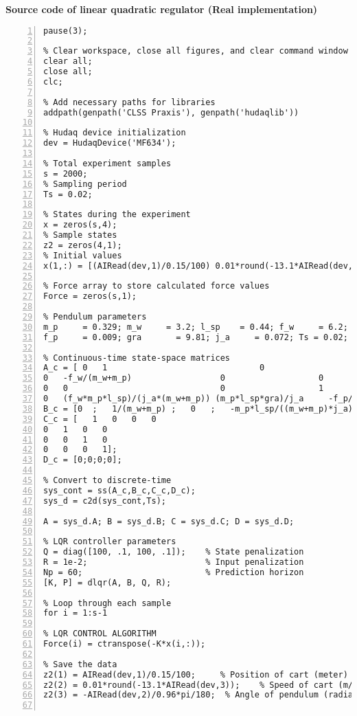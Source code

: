 \normalsize\bf{Source code of linear quadratic regulator (Real implementation)}
\label{lqrReal.m}
\vspace{1cm}
\begin{lstlisting}[numbers=left,basicstyle=\scriptsize,caption={Source code of linear quadratic regulator (Real implementation).},captionpos=b]	
% Pause for 3 seconds before starting the code execution
pause(3);

% Clear workspace, close all figures, and clear command window
clear all;
close all;
clc;

% Add necessary paths for libraries
addpath(genpath('CLSS Praxis'), genpath('hudaqlib'))

% Hudaq device initialization
dev = HudaqDevice('MF634');

% Total experiment samples
s = 2000;
% Sampling period
Ts = 0.02;

% States during the experiment
x = zeros(s,4);
% Sample states
z2 = zeros(4,1);
% Initial values
x(1,:) = [(AIRead(dev,1)/0.15/100) 0.01*round(-13.1*AIRead(dev,3)) (-AIRead(dev,2)/0.96*pi/180) 0];

% Force array to store calculated force values
Force = zeros(s,1);

% Pendulum parameters
m_p     = 0.329; m_w     = 3.2; l_sp    = 0.44; f_w     = 6.2; 
f_p     = 0.009; gra       = 9.81; j_a     = 0.072; Ts = 0.02; 

% Continuous-time state-space matrices
A_c = [ 0   1                               0                   0
0   -f_w/(m_w+m_p)                  0                   0
0   0                               0                   1
0   (f_w*m_p*l_sp)/(j_a*(m_w+m_p)) (m_p*l_sp*gra)/j_a     -f_p/j_a];   
B_c = [0  ;   1/(m_w+m_p) ;   0   ;   -m_p*l_sp/((m_w+m_p)*j_a)];
C_c = [   1   0   0   0
0   1   0   0
0   0   1   0
0   0   0   1];
D_c = [0;0;0;0];

% Convert to discrete-time
sys_cont = ss(A_c,B_c,C_c,D_c);
sys_d = c2d(sys_cont,Ts);

A = sys_d.A; B = sys_d.B; C = sys_d.C; D = sys_d.D;

% LQR controller parameters
Q = diag([100, .1, 100, .1]);    % State penalization 
R = 1e-2;                        % Input penalization
Np = 60;                         % Prediction horizon 
[K, P] = dlqr(A, B, Q, R);

% Loop through each sample
for i = 1:s-1

% LQR CONTROL ALGORITHM
Force(i) = ctranspose(-K*x(i,:));

% Save the data
z2(1) = AIRead(dev,1)/0.15/100;     % Position of cart (meter)
z2(2) = 0.01*round(-13.1*AIRead(dev,3));    % Speed of cart (m/s)
z2(3) = -AIRead(dev,2)/0.96*pi/180;  % Angle of pendulum (radian)


\end{lstlisting}
